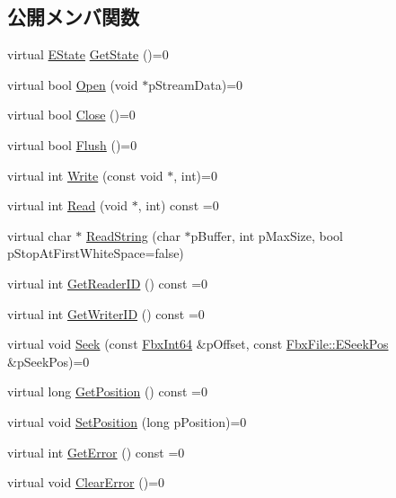 \subsection*{公開メンバ関数}
\begin{DoxyCompactItemize}
\item 
virtual \hyperlink{class_fbx_stream_adc469d38eb30339fa4190eb6c66ec8f7}{E\+State} \hyperlink{class_fbx_stream_a602172d138a0fc5c4cb3443b2b925296}{Get\+State} ()=0
\item 
virtual bool \hyperlink{class_fbx_stream_ab8b3c6e904344c1b1d74e457ae8a74e7}{Open} (void $\ast$p\+Stream\+Data)=0
\item 
virtual bool \hyperlink{class_fbx_stream_a6779ab0ccbe8e14e5cf5cf47f5206519}{Close} ()=0
\item 
virtual bool \hyperlink{class_fbx_stream_a9174d1c9a10e7f0f6f283c6b7f9a1dce}{Flush} ()=0
\item 
virtual int \hyperlink{class_fbx_stream_a0bd0142e0acd244bc4342381c28b7a9a}{Write} (const void $\ast$, int)=0
\item 
virtual int \hyperlink{class_fbx_stream_a2621d456bfda1f0e4e3492bcc81ec2e6}{Read} (void $\ast$, int) const =0
\item 
virtual char $\ast$ \hyperlink{class_fbx_stream_a9c72065cd571b54b1cbcd6dfa89adb32}{Read\+String} (char $\ast$p\+Buffer, int p\+Max\+Size, bool p\+Stop\+At\+First\+White\+Space=false)
\item 
virtual int \hyperlink{class_fbx_stream_ae2a7513a648cde508d00f5172ba2843d}{Get\+Reader\+ID} () const =0
\item 
virtual int \hyperlink{class_fbx_stream_af39d714bf396c28252772b5d8e7caa47}{Get\+Writer\+ID} () const =0
\item 
virtual void \hyperlink{class_fbx_stream_a00041c3874c430a77fb7e69a9adc894f}{Seek} (const \hyperlink{fbxtypes_8h_ac7e1334c7c6aacc9c8a9dccddebb4368}{Fbx\+Int64} \&p\+Offset, const \hyperlink{class_fbx_file_aba91fe59f9c0a4c84a92f13c0c27deec}{Fbx\+File\+::\+E\+Seek\+Pos} \&p\+Seek\+Pos)=0
\item 
virtual long \hyperlink{class_fbx_stream_aa63da9f62321748910acaa808322a794}{Get\+Position} () const =0
\item 
virtual void \hyperlink{class_fbx_stream_aeb8843a4daec9d82187cc3eea5bb9baa}{Set\+Position} (long p\+Position)=0
\item 
virtual int \hyperlink{class_fbx_stream_adec0d602a55d05e923980e048b8d5b54}{Get\+Error} () const =0
\item 
virtual void \hyperlink{class_fbx_stream_ad90dfab257677bb8cd62efb9d65d3a02}{Clear\+Error} ()=0

\end{DoxyCompactItemize}
